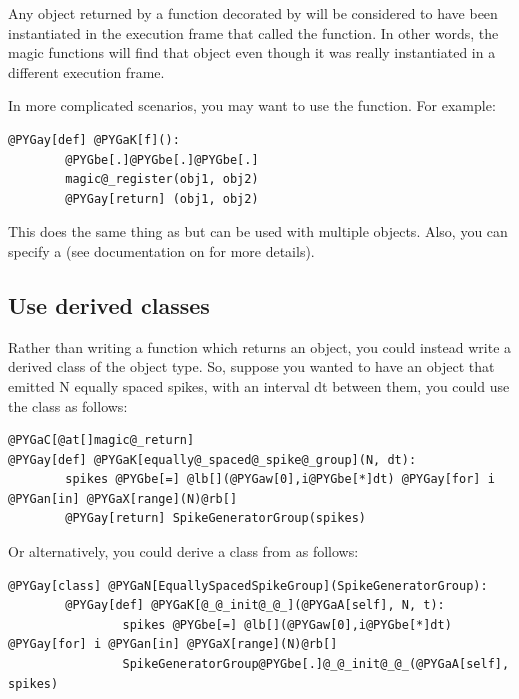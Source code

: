 \documentclass[letterpaper,10pt,english]{manual}
\begin{document}
Any object returned by a function decorated by \hyperlink{brian.magic_return}{} will be
considered to have been instantiated in the execution frame that called the
function. In other words, the magic functions will find that object even
though it was really instantiated in a different execution frame.

In more complicated scenarios, you may want to use the \hyperlink{brian.magic_register}{}
function. For example:

\begin{Verbatim}[commandchars=@\[\]]
@PYGay[def] @PYGaK[f]():
        @PYGbe[.]@PYGbe[.]@PYGbe[.]
        magic@_register(obj1, obj2)
        @PYGay[return] (obj1, obj2)
\end{Verbatim}

This does the same thing as \hyperlink{brian.magic_return}{} but can be used with
multiple objects. Also, you can specify a  (see documentation on
\hyperlink{brian.magic_register}{} for more details).

\subsection{Use derived classes}

Rather than writing a function which returns an object, you could instead
write a derived class of the object type. So, suppose you wanted to have an
object that emitted N equally spaced spikes, with an interval dt between
them, you could use the \hyperlink{brian.SpikeGeneratorGroup}{} class as follows:

\begin{Verbatim}[commandchars=@\[\]]
@PYGaC[@at[]magic@_return]
@PYGay[def] @PYGaK[equally@_spaced@_spike@_group](N, dt):
        spikes @PYGbe[=] @lb[](@PYGaw[0],i@PYGbe[*]dt) @PYGay[for] i @PYGan[in] @PYGaX[range](N)@rb[]
        @PYGay[return] SpikeGeneratorGroup(spikes)
\end{Verbatim}

Or alternatively, you could derive a class from \hyperlink{brian.SpikeGeneratorGroup}{}
as follows:

\begin{Verbatim}[commandchars=@\[\]]
@PYGay[class] @PYGaN[EquallySpacedSpikeGroup](SpikeGeneratorGroup):
        @PYGay[def] @PYGaK[@_@_init@_@_](@PYGaA[self], N, t):
                spikes @PYGbe[=] @lb[](@PYGaw[0],i@PYGbe[*]dt) @PYGay[for] i @PYGan[in] @PYGaX[range](N)@rb[]
                SpikeGeneratorGroup@PYGbe[.]@_@_init@_@_(@PYGaA[self], spikes)
\end{Verbatim}
\end{document}
